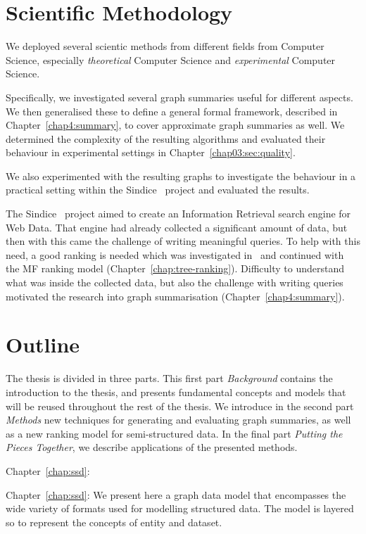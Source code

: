 \section{Scientific Methodology}

We deployed several scientic methods from different fields from Computer Science, especially \emph{theoretical} Computer Science and \emph{experimental} Computer Science.

Specifically, we investigated several graph summaries useful for different aspects. We then generalised these to define a general formal framework, described in Chapter~\ref{chap4:summary}, to cover approximate graph summaries as well. We determined the complexity of the resulting algorithms and evaluated their behaviour in experimental settings in Chapter~\ref{chap03:sec:quality}.

We also experimented with the resulting graphs to investigate the behaviour in a practical setting within the Sindice~\cite{delbru:jws:entity} project and evaluated the results.

The Sindice~\cite{delbru:jws:entity} project aimed to create an Information Retrieval search engine for Web Data. That engine had already collected a significant amount of data, but then with this came the challenge of writing meaningful queries. To help with this need, a good ranking is needed which was investigated in~\cite{delbru:2010:hierarchical} and continued with the MF ranking model (Chapter~\ref{chap:tree-ranking}). Difficulty to understand what was inside the collected data, but also the challenge with writing queries motivated the research into graph summarisation (Chapter~\ref{chap4:summary}).

\section{Outline}

The thesis is divided in three parts. This first part \emph{Background} contains the introduction to the thesis, and presents fundamental concepts and models that will be reused throughout the rest of the thesis. We introduce in the second part \emph{Methods} new techniques for generating and evaluating graph summaries, as well as a new ranking model for semi-structured data. In the final part \emph{Putting the Pieces Together}, we describe applications of the presented methods.


\begin{labeling}{Chapter~\ref{chap:ssd}:}
\item[Chapter~\ref{chap:ssd}:] We present here a graph data model that encompasses the wide variety of formats used for modelling structured data. The model is layered so to represent the concepts of entity and dataset.%
\end{labeling}

